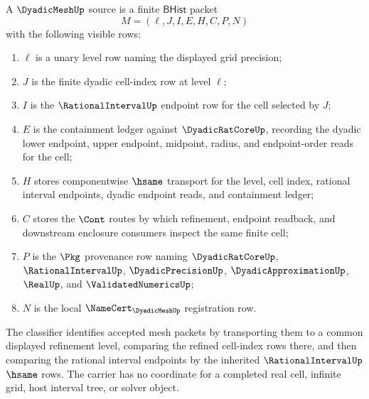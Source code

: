 \begin{definition}
\label{def:dyadicmesh-bhist-source}
A $\DyadicMeshUp$ source is a finite $\mathsf{BHist}$ packet
$$
M=(\ell,J,I,E,H,C,P,N)
$$
with the following visible rows:
\begin{enumerate}
\item $\ell$ is a unary level row naming the displayed grid precision;
\item $J$ is the finite dyadic cell-index row at level $\ell$;
\item $I$ is the $\RationalIntervalUp$ endpoint row for the cell selected by $J$;
\item $E$ is the containment ledger against $\DyadicRatCoreUp$, recording the dyadic lower endpoint, upper endpoint, midpoint, radius, and endpoint-order reads for the cell;
\item $H$ stores componentwise $\hsame$ transport for the level, cell index, rational interval endpoints, dyadic endpoint reads, and containment ledger;
\item $C$ stores the $\Cont$ routes by which refinement, endpoint readback, and downstream enclosure consumers inspect the same finite cell;
\item $P$ is the $\Pkg$ provenance row naming $\DyadicRatCoreUp$, $\RationalIntervalUp$, $\DyadicPrecisionUp$, $\DyadicApproximationUp$, $\RealUp$, and $\ValidatedNumericsUp$;
\item $N$ is the local $\NameCert_{\DyadicMeshUp}$ registration row.
\end{enumerate}
The classifier identifies accepted mesh packets by transporting them to a common displayed refinement level, comparing the refined cell-index rows there, and then comparing the rational interval endpoints by the inherited $\RationalIntervalUp$ $\hsame$ rows. The carrier has no coordinate for a completed real cell, infinite grid, host interval tree, or solver object.
\end{definition}

